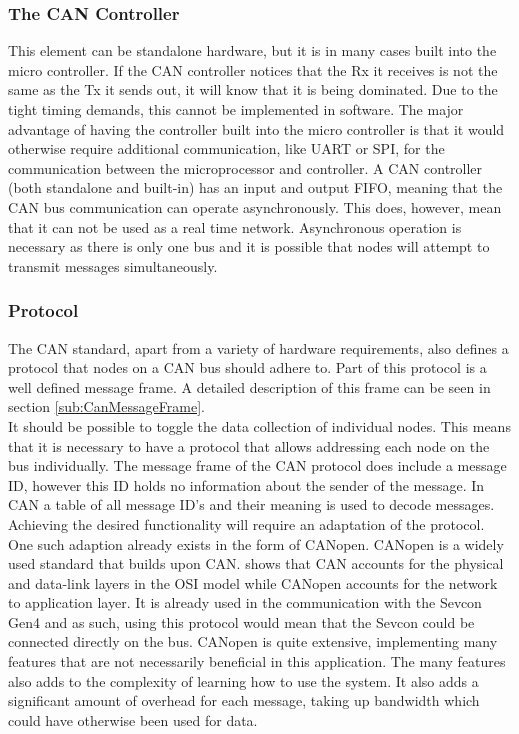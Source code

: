 \subsubsection*{The CAN Controller}
This element can be standalone hardware, but it is in many cases built into the micro controller.
If the CAN controller notices that the Rx it receives is not the same as the Tx it sends out, it will know that it is being dominated.
Due to the tight timing demands, this cannot be implemented in software.
The major advantage of having the controller built into the micro controller is that it would otherwise require additional communication, like UART or SPI, for the communication between the microprocessor and controller.
A CAN controller (both standalone and built-in) has an input and output FIFO, meaning that the CAN bus communication can operate asynchronously.
This does, however, mean that it can not be used as a real time network.
Asynchronous operation is necessary as there is only one bus and it is possible that nodes will attempt to transmit messages simultaneously.

\subsubsection*{Protocol}
The CAN standard, apart from a variety of hardware requirements, also defines a protocol that nodes on a CAN bus should adhere to.
Part of this protocol is a well defined message frame.
A detailed description of this frame can be seen in section \ref{sub:CanMessageFrame}.\\

It should be possible to toggle the data collection of individual nodes.
This means that it is necessary to have a protocol that allows addressing each node on the bus individually.
The message frame of the CAN protocol does include a message ID, however this ID holds no information about the sender of the message.
In CAN a table of all message ID's and their meaning is used to decode messages.
Achieving the desired functionality will require an adaptation of the protocol. \\

One such adaption already exists in the form of CANopen.
CANopen is a widely used standard that builds upon CAN.
\cite{CANopen_introduction} shows that CAN accounts for the physical and data-link layers in the OSI model while CANopen accounts for the network to application layer.
It is already used in the communication with the Sevcon Gen4 and as such, using this protocol would mean that the Sevcon could be connected directly on the bus.
CANopen is quite extensive, implementing many features that are not necessarily beneficial in this application.
The many features also adds to the complexity of learning how to use the system.
It also adds a significant amount of overhead for each message, taking up bandwidth which could have otherwise been used for data.\\

